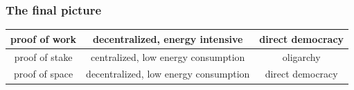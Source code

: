 \documentclass[11pt]{beamer}  %
\begin{document}
\begin{frame}\frametitle{The final picture}

  \begin{center}
    \begin{tabular}{c||c|c}
      proof of work & decentralized, energy intensive & direct democracy \\\hline
      proof of stake & centralized, low energy consumption & oligarchy \\\hline
      proof of space & decentralized, low energy consumption & direct democracy
    \end{tabular}
  \end{center}
  
\end{frame}
\end{document}
